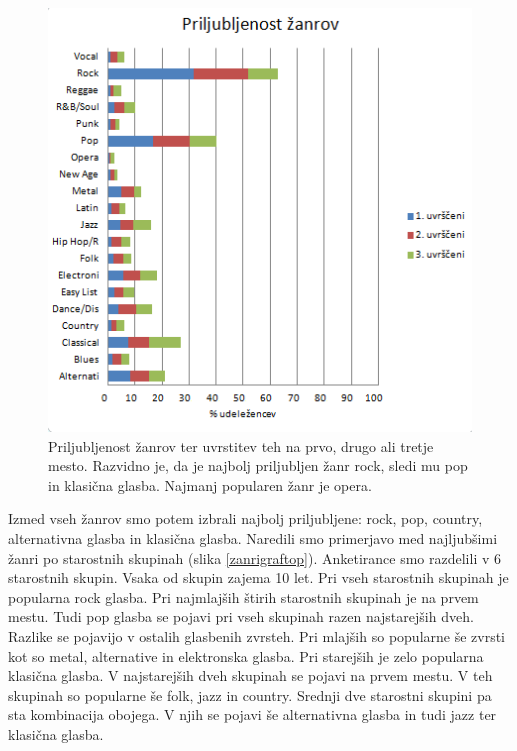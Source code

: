 \documentclass[a4paper, 12pt]{book}
\begin{document}
{\begin{figure}[hbt]
\centering
\includegraphics{images/genre.png}

\caption{Priljubljenost žanrov ter uvrstitev teh na prvo, drugo ali tretje mesto. Razvidno je, da je najbolj priljubljen žanr rock, sledi mu pop in klasična glasba. Najmanj popularen žanr je opera.}
\label{zanrigraf}
\end{figure}

Izmed vseh žanrov smo potem izbrali najbolj priljubljene: rock, pop, country, alternativna glasba in klasična glasba. Naredili smo primerjavo med najljubšimi žanri po starostnih skupinah (slika \ref{zanrigraftop}). Anketirance smo razdelili v 6 starostnih skupin. Vsaka od skupin zajema 10 let. Pri vseh starostnih skupinah je popularna rock glasba. Pri najmlajših štirih starostnih skupinah je na prvem mestu. Tudi pop glasba se pojavi pri vseh skupinah razen najstarejših dveh. Razlike se pojavijo v ostalih glasbenih zvrsteh. Pri mlajših so popularne še zvrsti kot so metal, alternative in elektronska glasba. Pri starejših je zelo popularna klasična glasba. V najstarejših dveh skupinah se pojavi na prvem mestu. V teh skupinah so popularne še folk, jazz in country. Srednji dve starostni skupini pa sta kombinacija obojega. V njih se pojavi še alternativna glasba in tudi jazz ter klasična glasba. 

}
\end{document}
